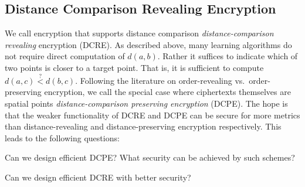 \subsection{Distance Comparison Revealing Encryption}
We call encryption that supports distance comparison \emph{distance-comparison revealing} encryption (DCRE).  As described above, many learning algorithms do not require direct computation of $d(a,b)$.  Rather it suffices to indicate which of two points is closer to a target point.  That is, it is sufficient to compute $d(a,c)\overset{?}<d(b,c)$.  Following the literature on order-revealing vs.~order-preserving encryption, we call the special case where ciphertexts themselves are spatial points \emph{distance-comparison preserving encryption} (DCPE).  The hope is that the weaker functionality of DCRE and DCPE can be secure for more metrics than distance-revealing and distance-preserving encryption respectively.
This leads to the following questions:

\begin{question}
Can we design efficient DCPE?  What security can be achieved by such schemes?
\end{question}
\begin{question}
Can we design efficient DCRE with better security?
\end{question}

